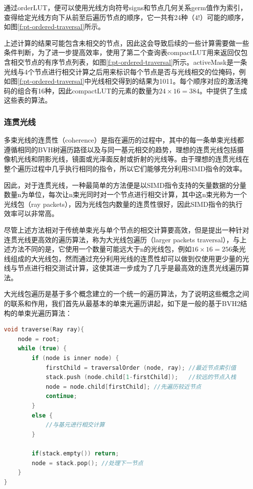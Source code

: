 通过orderLUT，便可以使用光线方向符号signs和节点几何关系germ值作为索引，查得给定光线方向下从前至后遍历节点的顺序，它一共有24种（$4!$）可能的顺序，如图\ref{f:pt-ordered-traversal}所示。

上述计算的结果可能包含未相交的节点，因此这会导致后续的一些计算需要做一些条件判断，为了进一步提高效率，\cite{a:EfficientRayTracingKernelsforModernCPUArchitectures}使用了第二个查询表compactLUT用来返回仅包含相交节点的有序节点列表，如图\ref{f:pt-ordered-traversal}所示。activeMask是一条光线与4个节点进行相交计算之后用来标识每个节点是否与光线相交的位掩码，例如图\ref{f:pt-ordered-traversal}中光线相交得到的结果为1011。每个顺序对应的激活掩码的组合有16种，因此compactLUT的元素的数量为$24\times 16=384$。\cite{a:EfficientRayTracingKernelsforModernCPUArchitectures}中提供了生成这些表的算法。






\subsubsection{连贯光线}\label{sec:coherent-ray-tracing}
多束光线的连贯性（coherence）是指在遍历的过程中，其中的每一条单束光线都遵循相同的BVH树遍历路径以及与同一基元相交的趋势，理想的连贯光线包括摄像机光线和阴影光线，镜面或光泽面反射或折射的光线等。由于理想的连贯光线在整个遍历过程中几乎执行相同的指令，所以它们能够充分利用SIMD指令的效率。

因此，对于连贯光线，一种最简单的方法便是以SIMD指令支持的矢量数据的分量数量n为单位，每次让n束光同时对一个节点进行相交计算，其中这n束光称为一个光线包（ray packets），因为光线包内数量的连贯性很好，因此SIMD指令的执行效率可以非常高。

尽管上述方法相对于传统单束光与单个节点的相交计算要高效，但是\cite{a:RayTracingDeformableScenesUsingDynamicBoundingVolumeHierarchies}提出一种针对连贯光线更高效的遍历算法，称为大光线包遍历（larger packets traversal），与上述方法不同的是，它使用一个数量可能远大于n的光线包，例如$16\times 16=256$条光线组成的大光线包，然而通过充分利用光线的连贯性却可以做到仅使用更少量的光线与节点进行相交测试计算，这使其进一步成为了几乎是最高效的连贯光线遍历算法。

大光线包遍历是基于多个概念建立的一个统一的遍历算法，为了说明这些概念之间的联系和作用，我们首先从最基本的单束光遍历讲起，如下是一般的基于BVH2结构的单束光遍历算法：

\begin{lstlisting}[language=C++]
void traverse(Ray ray){
	node = root;
	while (true) {
		if (node is inner node) {
			firstChild = traversalOrder (node, ray); //最近节点索引值
			stack.push (node.child[1-firstChild]);   //较远的节点入栈
			node = node.child[firstChild]; //先遍历较近节点
			continue;
		}
		else {
			//与基元进行相交计算
		}
			
		if(stack.empty()) return;
		node = stack.pop(); //处理下一节点
	}
}
\end{lstlisting}

